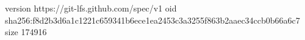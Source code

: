 version https://git-lfs.github.com/spec/v1
oid sha256:f8d2b3d6a1c1221c659341b6ece1ea2453c3a3255f863b2aaec34ccb0b66a6c7
size 174916
